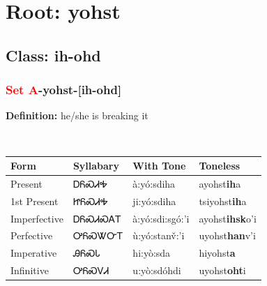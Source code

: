 \needspace{4in}
\section*{Root: yohst}
\nopagebreak
{}
\needspace{3in}
\subsection*{Class: ih-ohd}
\nopagebreak
\needspace{2in}
\subsubsection*{\textcolor{Red}{Set A}{-}\textbf{yohst}{-}[ih-ohd]}
\nopagebreak
\textbf{Definition: } he/she is breaking it
\\[0.5em]
\begin{tabularx}{\textwidth}{l X X X}%
\toprule%
\textbf{Form}&\textbf{Syllabary}&\textbf{With Tone}&\textbf{Toneless}\\%
\midrule%
Present&ᎠᏲᏍᏗᎭ&à:yó:sdiha&ayohst\textbf{ih}a\\%
1st Present&ᏥᏲᏍᏗᎭ&ji:yó:sdiha&tsiyohst\textbf{ih}a\\%
Imperfective&ᎠᏲᏍᏗᏍᎪᎢ&à:yó:sdi:sgó:’i&ayohst\textbf{ihsk}o'i\\%
Perfective&ᎤᏲᏍᏔᏅᎢ&ù:yó:stanv̌:’i&uyohst\textbf{han}v'i\\%
Imperative&ᎯᏲᏍᏓ&hi:yò:sda&hiyohst\textbf{a}\\%
Infinitive&ᎤᏲᏍᏙᏗ&u:yò:sdóhdi&uyohst\textbf{oht}i\\%
\bottomrule%
\end{tabularx}
\\[1em]